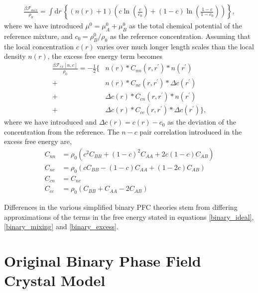 \documentclass[showkeys, prb, reprint]{revtex4-1}
\newcommand{\F}{\mathcal{F}}    %
\renewcommand{\l}{\left}        %
\renewcommand{\r}{\right}       %
\newcommand{\f}{\frac}          %
\newcommand{\B}{\rho_B}         %
\begin{document}
\begin{gather}
    \label{binary_mixing}
    \f{\beta\F_{mix}}{\rho_0} =
        \int \mathrm{d}r \,\l\lbrace (n(r) + 1) \l( 
            c\ln\l(\f{c}{c_0}\r) + (1-c)\ln\l(\f{1-c}{1-c_0}\r) \r)\r\rbrace, 
\end{gather}
%
where we have introduced $\mu^0=\mu_A^0+\mu_B^0$ as the total chemical
potential of the reference mixture, and $c_0 = \B^0 / \rho_0$ as the reference
concentration. Assuming that the local concentration $c(r)$ varies over much
longer length scales than the local density $n(r)$, the excess free energy term
becomes  
%
\begin{align}
    \label{binary_excess}
    \f{\beta\F_{ex}[n, c]}{\rho_0}
        = -\f{1}{2} \big\lbrace &n(r) \ast C_{nn}(r, r^\prime) \ast n(r^\prime) \\
          + & n(r) \ast C_{nc}(r, r^\prime) \ast \Delta c(r^\prime) \nonumber \\
          + &\Delta c(r) \ast C_{cn}(r, r^\prime) \ast n(r^\prime) \nonumber \\ 
          + &\Delta c(r) \ast C_{cc}(r, r^\prime) \ast \Delta c(r^\prime) \big\rbrace, \nonumber
\end{align}
%
where we have introduced  and $\Delta c(r) = c(r) - c_0$ as the deviation of the 
concentration from the reference.  The $n-c$ pair correlation introduced in the 
excess free energy are,
%
\begin{align}
    C_{nn} &= \rho_0\l(c^2 C_{BB} + (1 - c)^2C_{AA} + 2c(1-c)C_{AB}\r) \label{binaryCs}\\
    C_{nc} &= \rho_0\l(c C_{BB} - (1 - c) C_{AA} + (1 - 2c)C_{AB}\r) \\
    C_{cn} &= C_{nc} \\
    C_{cc} &= \rho_0\l(C_{BB} + C_{AA} - 2 C_{AB}\r)
\end{align}
%

Differences in the various simplified binary PFC theories stem from differing
approximations of the terms in the free energy stated in equations 
\ref{binary_ideal}, \ref{binary_mixing} and \ref{binary_excess}.

\section{Original Binary Phase Field Crystal Model} %
\end{document}
